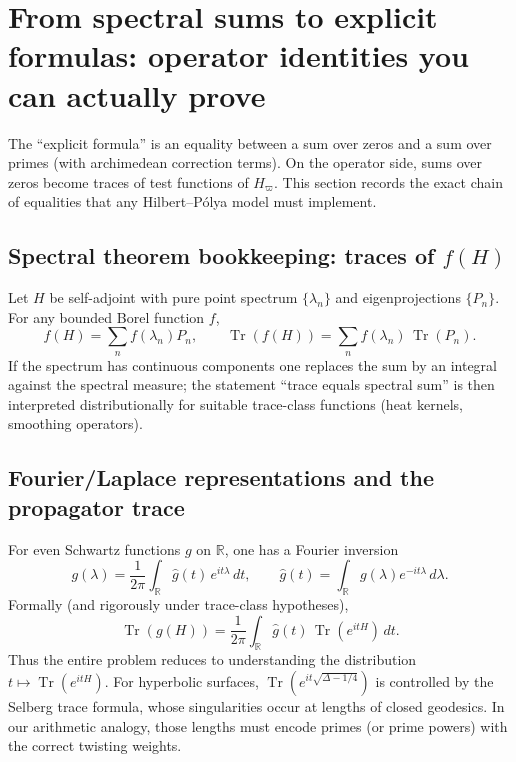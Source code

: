 \documentclass[11pt,oneside]{amsbook}
\numberwithin{equation}{section}
\theoremstyle{plain}
\theoremstyle{definition}
\theoremstyle{remark}
\DeclareMathOperator{\Tr}{\mathrm{Tr}}
\begin{document}
\section{From spectral sums to explicit formulas: operator identities you can actually prove}
\label{sec:trace_to_explicit_formula}

The ``explicit formula'' is an equality between a sum over zeros and a sum over primes (with archimedean correction terms).
On the operator side, sums over zeros become traces of test functions of $H_\varpi$.
This section records the exact chain of equalities that any Hilbert--Pólya model must implement.

\subsection{Spectral theorem bookkeeping: traces of $f(H)$}
Let $H$ be self-adjoint with pure point spectrum $\{\lambda_n\}$ and eigenprojections $\{P_n\}$.
For any bounded Borel function $f$,
\[
f(H)=\sum_n f(\lambda_n)P_n,
\qquad
\Tr(f(H))=\sum_n f(\lambda_n)\,\Tr(P_n).
\]
If the spectrum has continuous components one replaces the sum by an integral against the spectral measure; the statement ``trace equals spectral sum'' is then interpreted distributionally for suitable trace-class functions (heat kernels, smoothing operators).

\subsection{Fourier/Laplace representations and the propagator trace}
For even Schwartz functions $g$ on $\mathbb{R}$, one has a Fourier inversion
\[
g(\lambda)=\frac{1}{2\pi}\int_{\mathbb{R}} \widehat{g}(t)\,e^{it\lambda}\,dt,
\qquad
\widehat{g}(t)=\int_{\mathbb{R}} g(\lambda)e^{-it\lambda}\,d\lambda.
\]
Formally (and rigorously under trace-class hypotheses),
\begin{equation}
\label{eq:trace_fourier}
\Tr(g(H))=\frac{1}{2\pi}\int_{\mathbb{R}} \widehat{g}(t)\,\Tr(e^{itH})\,dt.
\end{equation}
Thus the entire problem reduces to understanding the distribution $t\mapsto \Tr(e^{itH})$.
For hyperbolic surfaces, $\Tr(e^{it\sqrt{\Delta-1/4}})$ is controlled by the Selberg trace formula, whose singularities occur at lengths of closed geodesics.
In our arithmetic analogy, those lengths must encode primes (or prime powers) with the correct twisting weights.
\end{document}
